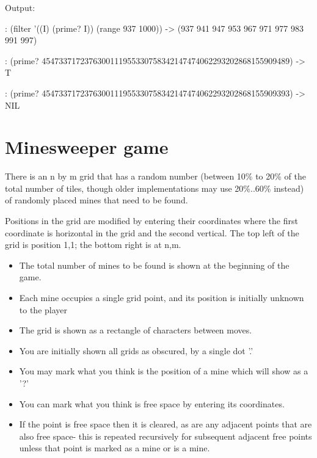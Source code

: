 \begin{wideverbatim}


Output:

: (filter '((I) (prime? I)) (range 937 1000))
-> (937 941 947 953 967 971 977 983 991 997)

: (prime? 4547337172376300111955330758342147474062293202868155909489)
-> T

: (prime? 4547337172376300111955330758342147474062293202868155909393)
-> NIL

\end{wideverbatim}

\pagebreak{}
\section*{Minesweeper game}

There is an n by m grid that has a random number (between 10\% to 20\%
of the total number of tiles, though older implementations may use
20\%..60\% instead) of randomly placed mines that need to be found.

Positions in the grid are modified by entering their coordinates where
the first coordinate is horizontal in the grid and the second vertical.
The top left of the grid is position 1,1; the bottom right is at n,m.

\begin{itemize}
\item
  The total number of mines to be found is shown at the beginning of the
  game.
\item
  Each mine occupies a single grid point, and its position is initially
  unknown to the player
\item
  The grid is shown as a rectangle of characters between moves.
\item
  You are initially shown all grids as obscured, by a single dot '.'
\item
  You may mark what you think is the position of a mine which will show
  as a '?'
\item
  You can mark what you think is free space by entering its coordinates.
\end{itemize}

\begin{itemize}
\item
  If the point is free space then it is cleared, as are any adjacent
  points that are also free space- this is repeated recursively for
  subsequent adjacent free points unless that point is marked as a mine
  or is a mine.
\end{itemize}

